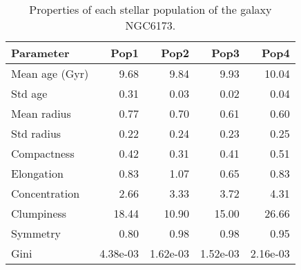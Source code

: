 \begin{table}[h]
\centering
\begin{tabular}{l|r|r|r|r}
Parameter & Pop1 & Pop2 & Pop3 & Pop4 \\\hline
Mean age (Gyr) & 9.68 & 9.84 & 9.93 & 10.04 \\
Std age & 0.31 & 0.03 & 0.02 & 0.04 \\
Mean radius & 0.77 & 0.70 & 0.61 & 0.60 \\
Std radius & 0.22 & 0.24 & 0.23 & 0.25 \\
Compactness & 0.42 & 0.31 & 0.41 & 0.51 \\
Elongation & 0.83 & 1.07 & 0.65 & 0.83 \\
Concentration & 2.66 & 3.33 & 3.72 & 4.31 \\
Clumpiness & 18.44 & 10.90 & 15.00 & 26.66 \\
Symmetry & 0.80 & 0.98 & 0.98 & 0.95 \\
Gini & 4.38e-03 & 1.62e-03 & 1.52e-03 & 2.16e-03 \\
\end{tabular}
\caption{\label{tab:widgets}Properties of each stellar population of the galaxy NGC6173.}
\end{table}
